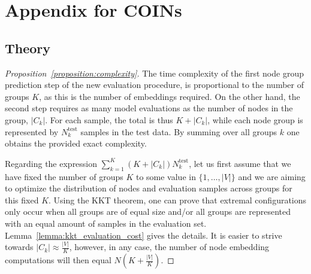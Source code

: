 \appendix
\chapter{Appendix for COINs}

\section{Theory}
\label{sec:appendix_proofs}

\begin{proof}[Proposition~\ref{proposition:complexity}]
    The time complexity of the first node group prediction step of the new evaluation procedure, is proportional to the number of groups $K$, as this is the number of embeddings required. On the other hand, the second step requires as many model evaluations as the number of nodes in the group, $|C_k|$. For each sample, the total is thus $K+|C_k|$, while each node group is represented by $N_k^{\text{test}}$ samples in the test data. By summing over all groups $k$ one obtains the provided exact complexity.

    Regarding the expression $\sum_{k=1}^{K}{(K+|C_k|)N_k^{\text{test}}}$, let us first assume that we have fixed the number of groups $K$ to some value in $\{1,\dots,|V|\}$ and we are aiming to optimize the distribution of nodes and evaluation samples across groups for this fixed $K$. Using the KKT theorem, one can prove that extremal configurations only occur when all groups are of equal size and/or all groups are represented with an equal amount of samples in the evaluation set. Lemma~\ref{lemma:kkt_evaluation_cost} gives the details. It is easier to strive towards $|C_k| \approx \frac{|V|}{K}$, however, in any case, the number of node embedding computations will then equal $N\left(K + \frac{|V|}{K}\right)$. 
    

\end{proof}
